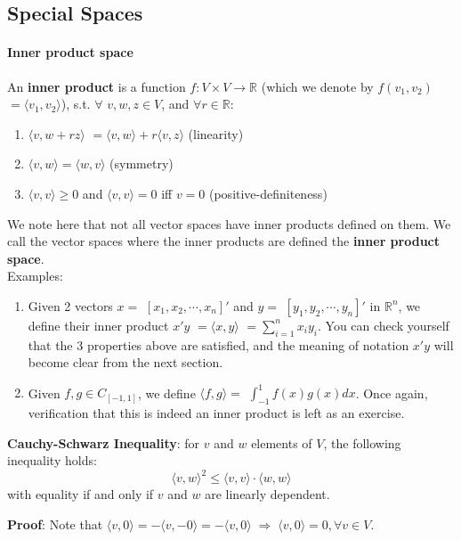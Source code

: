 \documentclass[12pt,oneside]{article}
\begin{document}
\subsection{Special Spaces}
\paragraph{Inner product space}
An \textbf{inner product} is a function $f: V \times V \rightarrow \mathbb{R}$
(which we denote by $f(v_{1}, v_{2})$ $= \langle v_{1}, v_{2} \rangle$),
s.t. $\forall$ $v, w, z \in V$, and $\forall r \in \mathbb{R}$:
\begin{enumerate}
\item $\langle v, w + r z \rangle$ $= \langle v, w \rangle + r \langle v, z \rangle$ (linearity)
\item $\langle v, w \rangle = \langle w, v \rangle$ (symmetry)
\item $\langle v, v \rangle \geq 0$ and $\langle v, v \rangle = 0$ iff $v = 0$ (positive-definiteness)
\end{enumerate}
We note here that not all vector spaces have inner products defined on
them.
We call the vector spaces where the inner products are defined the \textbf{inner product space}.\\

\noindent Examples:
\begin{enumerate}
\item Given 2 vectors $x =$ $\left[ x_{1},  x_{2}, \cdots, x_{n} \right]'$ and $y =$ $\left[ y_{1} , y_{2} , \cdots , y_{n} \right]'$ in ${\mathbb{R}}^{n}$, we define their inner product $x'y$ $= \langle x, y \rangle$ $= \displaystyle\sum_{i=1}^{n} {x_{i} y_{i}}$. You can check yourself that the 3 properties above are satisfied, and the meaning of notation $x' y$ will become clear from the next section.
\item Given $f, g \in C_{[-1, 1]}$, we define $\langle f, g \rangle =$ $\int_{-1}^{1} {f(x) g(x) dx}$. Once again, verification that this is indeed an inner product is left as an exercise.
\end{enumerate}


\noindent \textbf{Cauchy-Schwarz Inequality}: for $v$ and $w$ elements of $V$, the following inequality holds:
\[
\langle v,w \rangle^2\leq \langle v,v \rangle \cdot \langle w,w \rangle
\]
with equality if and only if $v$ and $w$ are linearly dependent.

\textbf{Proof}: Note that $\langle v,0 \rangle= -\langle v,-0 \rangle= -\langle v,0 \rangle \;\Rightarrow\; \langle v,0 \rangle=0,\forall v \in V.$
\end{document}
